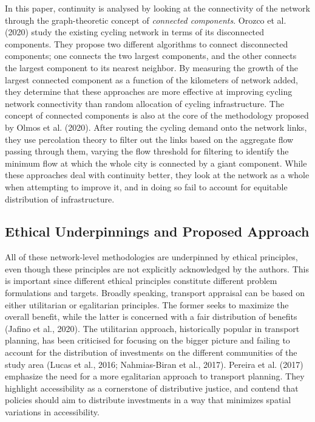\documentclass[
]{article}
\begin{document}
In this paper, continuity is analysed by looking at the connectivity of
the network through the graph-theoretic concept of \emph{connected
components}. Orozco et al. (2020) study the existing cycling network in terms of its disconnected
components. They propose two different algorithms to connect disconnected components; one connects the two largest components, and the other connects the largest component to its nearest neighbor. By measuring the growth of the largest connected component as a function of the kilometers of network added, they determine that these approaches are more effective at improving cycling network connectivity than random allocation of cycling infrastructure.
The concept of connected components is
also at the core of the methodology proposed by Olmos et al. (2020). After
routing the cycling demand onto the network links, they use percolation
theory to filter out the links based on the aggregate flow passing through them, varying the flow threshold for
filtering to identify the minimum flow at which the whole city is
connected by a giant component. While these approaches deal with
continuity better, they look at the network as a whole when attempting
to improve it, and in doing so fail to account for equitable
distribution of infrastructure.

\hypertarget{ethical-underpinnings-and-proposed-approach}{%
\subsection{Ethical Underpinnings and Proposed Approach}\label{ethical-underpinnings-and-proposed-approach}}

All of these network-level methodologies are underpinned by ethical
principles, even though these principles are not explicitly acknowledged
by the authors. This is important since different ethical principles
constitute different problem formulations and targets. Broadly speaking,
transport appraisal can be based on either utilitarian or egalitarian
principles. The former seeks to maximize the overall benefit, while the
latter is concerned with a fair distribution of benefits
(Jafino et al., 2020).
The utilitarian approach, historically popular in transport planning, has been criticised for focusing on the bigger picture and failing to account for the distribution of investments on the different communities of the study area (Lucas et al., 2016; Nahmias-Biran et al., 2017).
Pereira et al. (2017) emphasize the need for a more
egalitarian approach to transport planning. They highlight accessibility
as a cornerstone of distributive justice, and contend that policies
should aim to distribute investments in a way that minimizes spatial
variations in accessibility.
\end{document}
